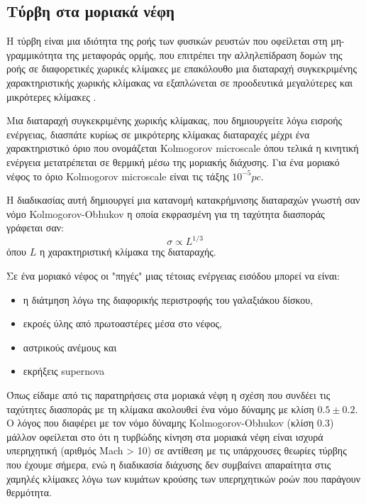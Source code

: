 \documentclass[a4paper,12pt]{memoir}
\begin{document}
\subsection{Τύρβη στα μοριακά νέφη}
Η τύρβη είναι μια ιδιότητα της ροής των φυσικών ρευστών που οφείλεται στη μη-γραμμικότητα της μεταφοράς ορμής, που επιτρέπει την αλληλεπίδραση δομών της ροής σε διαφορετικές χωρικές κλίμακες με επακόλουθο μια διαταραχή συγκεκριμένης χαρακτηριστικής χωρικής κλίμακας να εξαπλώνεται σε προοδευτικά μεγαλύτερες και μικρότερες κλίμακες \cite{sofianos_turbulence}.

Μια διαταραχή συγκεκριμένης χωρικής κλίμακας, που δημιουργείτε λόγω εισροής ενέργειας, διασπάτε κυρίως σε μικρότερης κλίμακας διαταραχές μέχρι ένα χαρακτηριστικό όριο που ονομάζεται Kolmogorov microscale όπου τελικά η κινητική ενέργεια μετατρέπεται σε θερμική μέσω της μοριακής διάχυσης. Για ένα μοριακό νέφος το όριο Kolmogorov microscale είναι τις τάξης $10^{-5} pc$.

Η διαδικασίας αυτή δημιουργεί μια κατανομή κατακρήμνισης διαταραχών γνωστή σαν νόμο Kolmogorov-Obhukov η οποία εκφρασμένη για τη ταχύτητα διασποράς γράφεται σαν:
\begin{equation}
\sigma \propto L^{1/3}
\end{equation} 
όπου $L$ η χαρακτηριστική κλίμακα της διαταραχής.

Σε ένα μοριακό νέφος οι "πηγές" μιας τέτοιας ενέργειας εισόδου μπορεί να είναι:
\begin{itemize}
	\item η διάτμηση λόγω της διαφορικής περιστροφής του γαλαξιάκου δίσκου,
	\item εκροές ύλης από πρωτοαστέρες μέσα στο νέφος,
	\item αστρικούς ανέμους και
	\item εκρήξεις supernova
\end{itemize}

Όπως είδαμε από τις παρατηρήσεις στα μοριακά νέφη η σχέση που συνδέει τις ταχύτητες διασποράς με τη κλίμακα ακολουθεί ένα νόμο δύναμης με κλίση $0.5 \pm 0.2$.  Ο λόγος που διαφέρει με τον νόμο δύναμης Kolmogorov-Obhukov (κλίση $0.3$) μάλλον οφείλεται στο ότι η τυρβώδης κίνηση στα μοριακά νέφη είναι ισχυρά υπερηχητική (αριθμός Mach > 10) σε αντίθεση με τις υπάρχουσες θεωρίες τύρβης που έχουμε σήμερα, ενώ η διαδικασία διάχυσης δεν συμβαίνει απαραίτητα στις χαμηλές κλίμακες λόγω των κυμάτων κρούσης των υπερηχητικών ροών που παράγουν θερμότητα.
\end{document}
